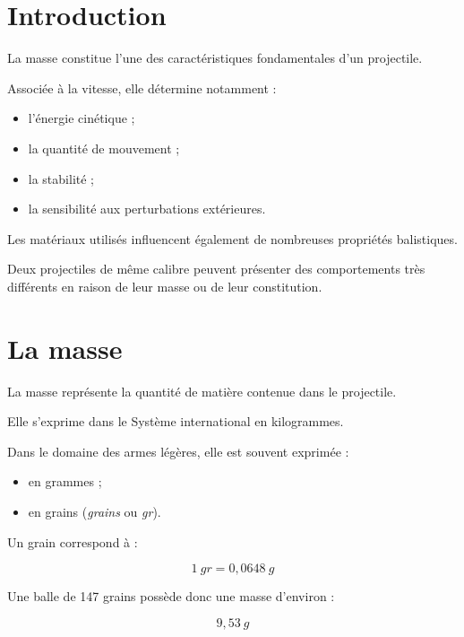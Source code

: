
\section{Introduction}

La masse constitue l'une des caractéristiques fondamentales d'un projectile.

Associée à la vitesse, elle détermine notamment :

\begin{itemize}
    \item l'énergie cinétique ;
    \item la quantité de mouvement ;
    \item la stabilité ;
    \item la sensibilité aux perturbations extérieures.
\end{itemize}

Les matériaux utilisés influencent également de nombreuses propriétés
balistiques.

\begin{aretenir}

Deux projectiles de même calibre peuvent présenter des comportements très
différents en raison de leur masse ou de leur constitution.

\end{aretenir}

\section{La masse}

La masse représente la quantité de matière contenue dans le projectile.

Elle s'exprime dans le Système international en kilogrammes.

Dans le domaine des armes légères, elle est souvent exprimée :

\begin{itemize}
    \item en grammes ;
    \item en grains (\emph{grains} ou \emph{gr}).
\end{itemize}

\begin{exemple}

Un grain correspond à :

\begin{equation}
1~gr = 0,0648~g
\end{equation}

Une balle de 147 grains possède donc une masse d'environ :

\begin{equation}
9,53~g
\end{equation}

\end{exemple}

